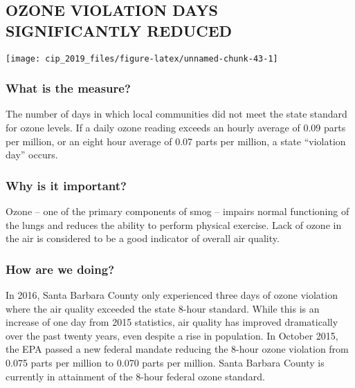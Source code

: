 \documentclass[]{book}
\theoremstyle{definition}
\theoremstyle{definition}
\theoremstyle{definition}
\theoremstyle{remark}
\begin{document}
\subsection*{OZONE VIOLATION DAYS SIGNIFICANTLY
REDUCED}\label{ozone-violation-days-significantly-reduced}

\texttt{[image: cip\_2019\_files/figure-latex/unnamed-chunk-43-1]}

\subsubsection*{What is the measure?}\label{what-is-the-measure-18}

The number of days in which local communities did not meet the state
standard for ozone levels. If a daily ozone reading exceeds an hourly
average of 0.09 parts per million, or an eight hour average of 0.07
parts per million, a state ``violation day'' occurs.

\subsubsection*{Why is it important?}\label{why-is-it-important-17}

Ozone -- one of the primary components of smog -- impairs normal
functioning of the lungs and reduces the ability to perform physical
exercise. Lack of ozone in the air is considered to be a good indicator
of overall air quality.

\subsubsection*{How are we doing?}\label{how-are-we-doing-24}

In 2016, Santa Barbara County only experienced three days of ozone
violation where the air quality exceeded the state 8-hour standard.
While this is an increase of one day from 2015 statistics, air quality
has improved dramatically over the past twenty years, even despite a
rise in population. In October 2015, the EPA passed a new federal
mandate reducing the 8-hour ozone violation from 0.075 parts per million
to 0.070 parts per million. Santa Barbara County is currently in
attainment of the 8-hour federal ozone standard.
\end{document}
